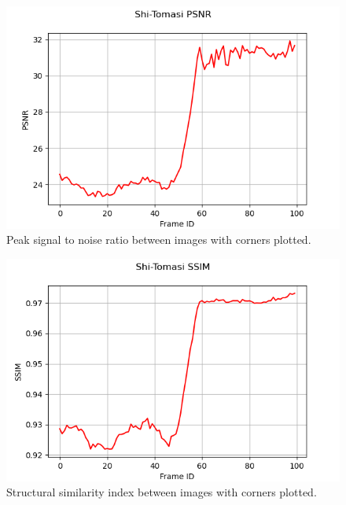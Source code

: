 \documentclass[11pt, conference, letterpaper]{IEEEtran}
\begin{document}
\begin{figure}[t]
    \centering
    \includegraphics[width=\linewidth]{images/stc_psnr.png}
    \caption{Peak signal to noise ratio between images with corners plotted.}
    \label{fig:stc-psnr}
\end{figure}

\begin{figure}[t]
    \centering
    \includegraphics[width=\linewidth]{images/stc_ssim.png}
    \caption{Structural similarity index between images with corners plotted.}
    \label{fig:stc-ssim}
\end{figure}
\end{document}
